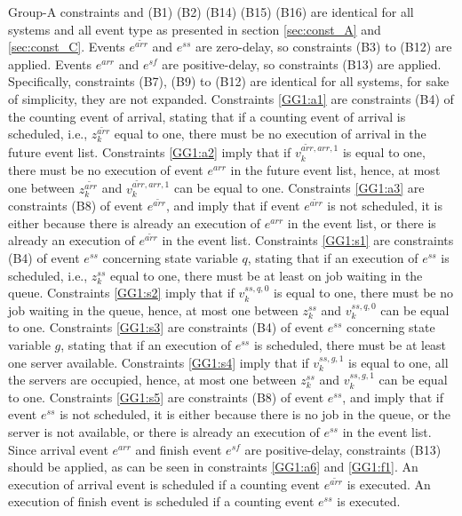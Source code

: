 \documentclass[]{interact}
\theoremstyle{plain}%
\theoremstyle{definition}
\theoremstyle{remark}
\begin{document}
Group-A constraints and (B1) (B2) (B14) (B15) (B16) are identical for all systems and all event type as presented in section \ref{sec:const_A} and \ref{sec:const_C}.  Events $e^{\tilde{arr}}$ and $e^{ss}$ are zero-delay, so constraints (B3) to (B12) are applied. Events $e^{arr}$ and $e^{sf}$ are positive-delay, so constraints (B13) are applied. Specifically, constraints (B7), (B9) to (B12) are identical for all systems, for sake of simplicity, they are not expanded. Constraints \eqref{GG1:a1} are constraints (B4) of the counting event of arrival, stating that if a counting event of arrival is scheduled, i.e., $z^{\tilde{arr}}_{k}$ equal to one, there must be no execution of arrival in the future event list. Constraints \eqref{GG1:a2} imply that if $v^{\tilde{arr},arr,1}_k$ is equal to one, there must be no execution of event $e^{arr}$ in the future event list, hence, at most one between $z^{\tilde{arr}}_{k}$ and $v^{\tilde{arr},arr,1}_k$ can be equal to one. Constraints \eqref{GG1:a3} are constraints (B8) of event $e^{\tilde{arr}}$, and imply that if event $e^{\tilde{arr}}$ is not scheduled, it is either because there is already an execution of $e^{arr}$ in the event list, or there is already an execution of $e^{\tilde{arr}}$ in the event list. 
Constraints \eqref{GG1:s1} are constraints (B4) of event $e^{ss}$ concerning state variable $q$, stating that if an execution of $e^{ss}$ is scheduled, i.e., $z^{ss}_{k}$ equal to one, there must be at least on job waiting in the queue. Constraints \eqref{GG1:s2} imply that if $v^{ss,q,0}_k$ is equal to one, there must be no job waiting in the queue, hence, at most one between $z^{ss}_{k}$ and $v^{ss,q,0}_k$ can be equal to one. Constraints \eqref{GG1:s3} are constraints (B4) of event $e^{ss}$ concerning state variable $g$, stating that if an execution of $e^{ss}$ is scheduled, there must be at least one server available. Constraints \eqref{GG1:s4} imply that if $v^{ss,g,1}_k$ is equal to one, all the servers are occupied, hence, at most one between $z^{ss}_{k}$ and $v^{ss,g,1}_k$ can be equal to one. Constraints \eqref{GG1:s5} are constraints (B8) of event $e^{ss}$, and imply that if event $e^{ss}$ is not scheduled, it is either because there is no job in the queue, or the server is not available, or there is already an execution of $e^{ss}$ in the event list. 
Since arrival event $e^{arr}$ and finish event $e^{sf}$ are positive-delay, constraints (B13) should be applied, as can be seen in constraints \eqref{GG1:a6} and \eqref{GG1:f1}. An execution of arrival event is scheduled if a counting event $e^{\tilde{arr}}$ is executed. An execution of finish event is scheduled if a counting event $e^{ss}$ is executed. 
\end{document}
